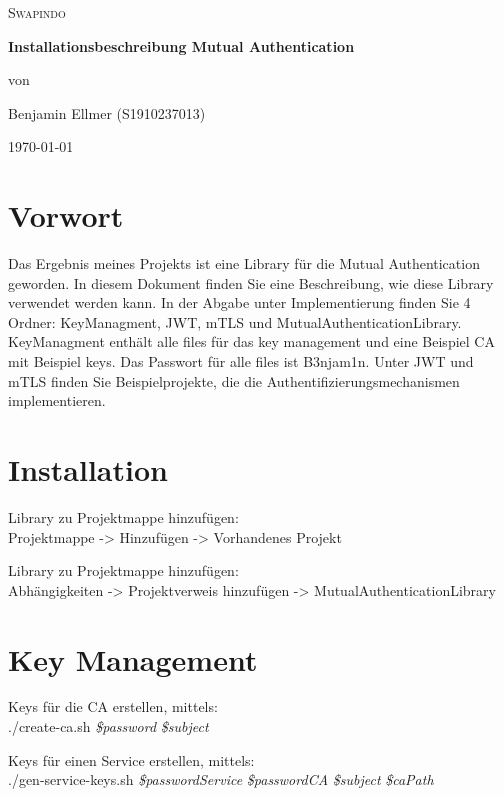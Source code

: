\documentclass[14pt,a4paper]{extarticle}
\begin{document}
	\begin{titlepage}
		\centering
		{\scshape\LARGE Swapindo \par}
		\vspace{2.5cm}
		{\huge\bfseries Installationsbeschreibung Mutual Authentication \par}
		\vfill
		von\par
		Benjamin Ellmer (\textsc{S1910237013})
	
		\vfill
		{\large \today\par}
	\end{titlepage}
	\newpage

	\tableofcontents
	\newpage
	
	\section{Vorwort}
	Das Ergebnis meines Projekts ist eine Library für die Mutual Authentication geworden.
	In diesem Dokument finden Sie eine Beschreibung, wie diese Library verwendet werden kann.
	In der Abgabe unter Implementierung finden Sie 4 Ordner: KeyManagment, JWT, mTLS und MutualAuthenticationLibrary.
	KeyManagment enthält alle files für das key management und eine Beispiel CA mit Beispiel keys. 
	Das Passwort für alle files ist B3njam1n.
	Unter JWT und mTLS finden Sie Beispielprojekte, die die Authentifizierungsmechanismen implementieren.

	\section{Installation}
	\noindent Library zu Projektmappe hinzufügen: \\
		Projektmappe -> Hinzufügen -> Vorhandenes Projekt 
	\vspace{1cm}

	\noindent Library zu Projektmappe hinzufügen: \\
		Abhängigkeiten -> Projektverweis hinzufügen -> MutualAuthenticationLibrary

	\section{Key Management}
	\noindent Keys für die CA erstellen, mittels: \\
	./create-ca.sh \textit{\$password} \textit{\$subject}
	\vspace{1cm}

	\noindent Keys für einen Service erstellen, mittels: \\
	./gen-service-keys.sh \textit{\$passwordService} \textit{\$passwordCA} \textit{\$subject} \textit{\$caPath}
	\vspace{1cm}
\end{document}
